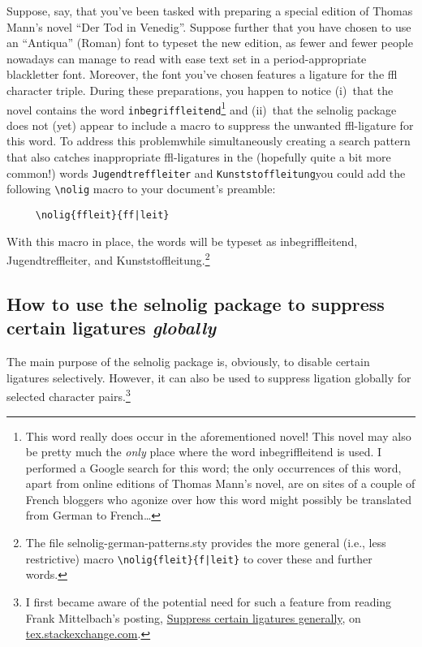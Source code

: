 \documentclass[11pt]{article}
\newcommand{\pkg}[1]{\textsf{#1}}
\newcommand{\opt}[1]{\texttt{#1}}
\begin{document}
Suppose, say, that you've been tasked with preparing a special edition of Thomas Mann's novel \enquote{Der Tod in Venedig}. Suppose further that you have chosen to use an \enquote{Antiqua} (Roman) font to typeset the new edition, as fewer and fewer people nowadays can manage to read with ease text set in a {\blackletterfont period-appropriate blackletter font}. Moreover, the font you've chosen features a ligature for the ffl character triple. During these preparations, you happen to notice (i)~that the novel contains the word \opt{inbegriffleitend}\footnote{This word really does occur in the aforementioned novel! This novel may also be pretty much the \emph{only} place where the word inbegriffleitend is used. I performed a Google search for this word; the only occurrences of this word, apart from online editions of Thomas Mann's novel, are on sites of a couple of French bloggers who agonize over how this word might possibly be translated from German to French\dots} and (ii)~that the \pkg{selnolig} package does not (yet) appear to include a macro to suppress the unwanted ffl-ligature for this word. To address this problem\textemdash while simultaneously creating a search pattern that also catches inappropriate ffl-ligatures in the (hopefully quite a bit more common!) words \opt{Jugendtreffleiter} and \opt{Kunststoffleitung}\textemdash you could add the following \Verb+\nolig+ macro to your document's preamble:
\begin{Verbatim}
     \nolig{ffleit}{ff|leit}
\end{Verbatim}
With this macro in place, the words will be typeset as inbegriffleitend, Jugendtreffleiter, and Kunststoffleitung.\footnote{The file \pkg{selnolig-german-patterns.sty} provides the more general (i.e., less restrictive) macro \Verb+\nolig{fleit}{f|leit}+ to cover these and further words.} 



\subsection[How to use the selnolig package to suppress certain ligatures globally]{How to use the \pkg{selnolig} package to suppress certain ligatures \emph{globally}}
\label{sec:global-nolig}


The main purpose of the \pkg{selnolig} package is, obviously, to disable certain ligatures selectively. However, it can also be used to suppress ligation globally for selected character pairs.\footnote{I first became aware of the potential need for such a feature from reading Frank Mittelbach's posting, \href{http://tex.stackexchange.com/q/61042/5001}{Suppress certain ligatures generally}, on \url{tex.stackexchange.com}. } 
\end{document}
